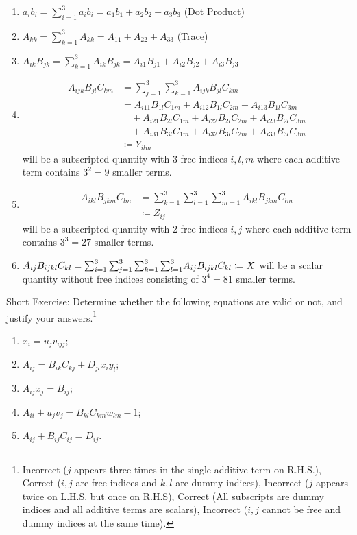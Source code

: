 \begin{enumerate}
    \item $a_ib_i = \sum_{i=1}^3 a_ib_i = a_1b_1 + a_2b_2 + a_3b_3$ (Dot Product)
    \item $A_{kk} = \sum_{k=1}^3 A_{kk} = A_{11} + A_{22} + A_{33}$ (Trace)
    \item $A_{ik}B_{jk} = \sum_{k=1}^3 A_{ik}B_{jk} = A_{i1}B_{j1} + A_{i2}B_{j2} + A_{i3}B_{j3}$
    \item \begin{align*}
    A_{ijk}B_{jl}C_{km} &= \sum_{j=1}^3 \sum_{k=1}^3 A_{ijk}B_{jl}C_{km} \\
    &= A_{i11}B_{1l}C_{1m} + A_{i12}B_{1l}C_{2m} + A_{i13}B_{1l}C_{3m} \\
    &\quad + A_{i21}B_{2l}C_{1m} + A_{i22}B_{2l}C_{2m} + A_{i23}B_{2l}C_{3m} \\
    &\quad + A_{i31}B_{3l}C_{1m} + A_{i32}B_{3l}C_{2m} + A_{i33}B_{3l}C_{3m} \\
    &\coloneq Y_{ilm}
    \end{align*}
    will be a subscripted quantity with 3 free indices $i, l, m$ where each additive term contains $3^2 = 9$ smaller terms.
    \item \begin{align*}
    A_{ikl}B_{jkm}C_{lm} &= \sum_{k=1}^3 \sum_{l=1}^3 \sum_{m=1}^3 A_{ikl}B_{jkm}C_{lm} \\
    &\coloneq Z_{ij}
    \end{align*}
    will be a subscripted quantity with 2 free indices $i, j$ where each additive term contains $3^3 = 27$ smaller terms.
    \item $A_{ij}B_{ijkl}C_{kl} = \smash{\sum_{i=1}^3 \sum_{j=1}^3 \sum_{k=1}^3 \sum_{l=1}^3} A_{ij}B_{ijkl}C_{kl} \coloneq X$ will be a scalar quantity without free indices consisting of $3^4 = 81$ smaller terms.
\end{enumerate}
Short Exercise: Determine whether the following equations are valid or not, and justify your answers.\footnote{Incorrect ($j$ appears three times in the single additive term on R.H.S.), Correct ($i,j$ are free indices and $k,l$ are dummy indices), Incorrect ($j$ appears twice on L.H.S. but once on R.H.S), Correct (All subscripts are dummy indices and all additive terms are scalars), Incorrect ($i,j$ cannot be free and dummy indices at the same time).}
\begin{enumerate}
    \item $x_i = u_jv_{ijj}$;
    \item $A_{ij} = B_{ik}C_{kj} + D_{jl}x_iy_l$;
    \item $A_{ij}x_j = B_{ij}$;
    \item $A_{ii} + u_jv_j = B_{kl}C_{km}w_{lm} - 1$;
    \item $A_{ij} + B_{ij}C_{ij} = D_{ij}$.
\end{enumerate}

